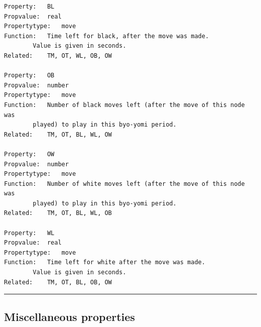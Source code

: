 \begin{verbatim}
Property:   BL
Propvalue:  real
Propertytype:   move
Function:   Time left for black, after the move was made.
        Value is given in seconds.
Related:    TM, OT, WL, OB, OW

Property:   OB
Propvalue:  number
Propertytype:   move
Function:   Number of black moves left (after the move of this node was
        played) to play in this byo-yomi period.
Related:    TM, OT, BL, WL, OW

Property:   OW
Propvalue:  number
Propertytype:   move
Function:   Number of white moves left (after the move of this node was
        played) to play in this byo-yomi period.
Related:    TM, OT, BL, WL, OB

Property:   WL
Propvalue:  real
Propertytype:   move
Function:   Time left for white after the move was made.
        Value is given in seconds.
Related:    TM, OT, BL, OB, OW
\end{verbatim}

\begin{center}\rule{0.5\linewidth}{0.5pt}\end{center}

\subsection{Miscellaneous properties}\label{miscellaneous-properties}

